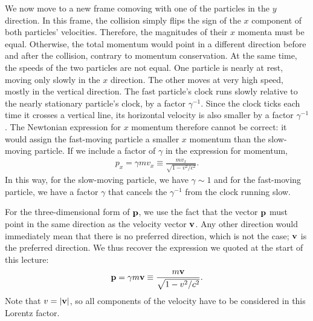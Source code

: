 \documentclass[12pt]{article}
\newcommand{\be}{\begin{eqnarray}}
\newcommand{\ee}{\end{eqnarray}}
\begin{document}
We now move to a new frame comoving with one of the particles in the $y$ direction. In this frame, the collision simply flips the sign of the $x$ component of both particles' velocities. Therefore, the magnitudes of their $x$ momenta must be equal. Otherwise, the total momentum would point in a different direction before and after the collision, contrary to momentum conservation. At the same time, the speeds of the two particles are not equal. One particle is nearly at rest, moving only slowly in the $x$ direction. The other moves at very high speed, mostly in the vertical direction. The fast particle's clock runs slowly relative to the nearly stationary particle's clock, by a factor $\gamma^{-1}$. Since the clock ticks each time it crosses a vertical line, its horizontal velocity is also smaller by a factor $\gamma^{-1}$. The Newtonian expression for $x$ momentum therefore cannot be correct: it would assign the fast-moving particle a smaller $x$ momentum than the slow-moving particle. If we include a factor of $\gamma$ in the expression for momentum,
\be
p_x =\gamma m v_x \equiv \frac{m v_x}{\sqrt{1-v^2/c^2}}.
\ee
In this way, for the slow-moving particle, we have $\gamma \sim 1$ and for the fast-moving particle, we have a factor $\gamma$ that cancels the $\gamma^{-1}$ from the clock running slow. 

For the three-dimensional form of $\bf p$, we use the fact that the vector ${\bf p}$ must point in the same direction as the velocity vector $\bf v$. Any other direction would immediately mean that there is no preferred direction, which is not the case; $\bf v$ is the preferred direction. We thus recover the expression we quoted at the start of this lecture:
\be
{\bf p} = \gamma m {\bf v} \equiv \frac{m {\bf v}}{\sqrt{1-v^2/c^2}}.
\ee
Note that $v = |{\bf v}|$, so all components of the velocity have to be considered in this Lorentz factor. \\
\end{document}
